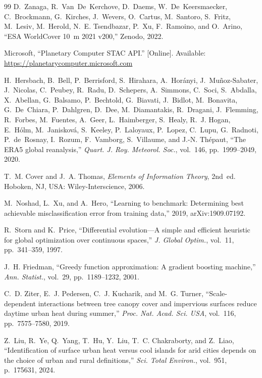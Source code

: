 \documentclass[journal]{IEEEtran}
\begin{document}
\begin{thebibliography}{99}
D.~Zanaga, R.~Van~De~Kerchove, D.~Daems, W.~De~Keersmaecker,
C.~Brockmann, G.~Kirches, J.~Wevers, O.~Cartus, M.~Santoro, S.~Fritz,
M.~Lesiv, M.~Herold, N.~E. Tsendbazar, P.~Xu, F.~Ramoino, and O.~Arino,
``ESA WorldCover 10~m 2021 v200,'' Zenodo, 2022.

Microsoft, ``Planetary Computer STAC API.'' [Online]. Available:
\url{https://planetarycomputer.microsoft.com}

H.~Hersbach, B.~Bell, P.~Berrisford, S.~Hirahara, A.~Hor\'anyi,
J.~Mu\~noz-Sabater, J.~Nicolas, C.~Peubey, R.~Radu, D.~Schepers,
A.~Simmons, C.~Soci, S.~Abdalla, X.~Abellan, G.~Balsamo, P.~Bechtold,
G.~Biavati, J.~Bidlot, M.~Bonavita, G.~De~Chiara, P.~Dahlgren, D.~Dee,
M.~Diamantakis, R.~Dragani, J.~Flemming, R.~Forbes, M.~Fuentes, A.~Geer,
L.~Haimberger, S.~Healy, R.~J. Hogan, E.~H\'olm, M.~Janiskov\'a,
S.~Keeley, P.~Laloyaux, P.~Lopez, C.~Lupu, G.~Radnoti, P.~de~Rosnay,
I.~Rozum, F.~Vamborg, S.~Villaume, and J.-N. Th\'epaut, ``The ERA5 global
reanalysis,'' \emph{Quart. J. Roy. Meteorol. Soc.}, vol.~146,
pp.~1999--2049, 2020.

T.~M. Cover and J.~A. Thomas, \emph{Elements of Information Theory}, 2nd~ed.
Hoboken, NJ, USA: Wiley-Interscience, 2006.

M.~Noshad, L.~Xu, and A.~Hero, ``Learning to benchmark: Determining best
achievable misclassification error from training data,'' 2019,
arXiv:1909.07192.

R.~Storn and K.~Price, ``Differential evolution---A simple and efficient
heuristic for global optimization over continuous spaces,'' \emph{J.
Global Optim.}, vol.~11, pp.~341--359, 1997.

J.~H. Friedman, ``Greedy function approximation: A gradient boosting
machine,'' \emph{Ann. Statist.}, vol.~29, pp.~1189--1232, 2001.

C.~D. Ziter, E.~J. Pedersen, C.~J. Kucharik, and M.~G. Turner,
``Scale-dependent interactions between tree canopy cover and impervious
surfaces reduce daytime urban heat during summer,'' \emph{Proc. Nat. Acad.
Sci. USA}, vol.~116, pp.~7575--7580, 2019.

Z.~Liu, R.~Ye, Q.~Yang, T.~Hu, Y.~Liu, T.~C. Chakraborty, and Z.~Liao,
``Identification of surface urban heat versus cool islands for arid cities
depends on the choice of urban and rural definitions,'' \emph{Sci. Total
Environ.}, vol.~951, p.~175631, 2024.


\end{thebibliography}
\end{document}

